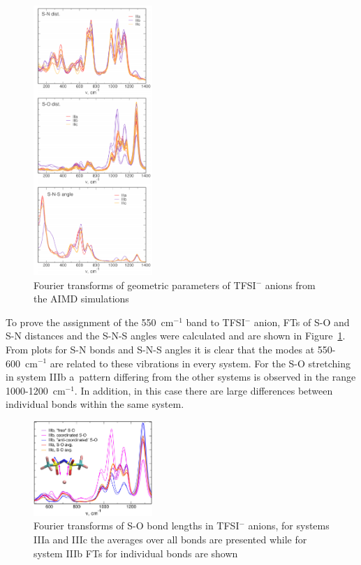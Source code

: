 \begin{figure}[ht]
    \centering
    \includegraphics[width=0.4\textwidth]{img/4-ir-spectra-from-aimd-simulations/2-mg-cl-dme/ft-s-o-angles.png}
    \caption{Fourier transforms of geometric parameters of TFSI$^{-}$ anions from the AIMD simulations}
    \label{fig:mg-cl-dme-ft-s-o-angles}
\end{figure}

To prove the assignment of the 550~cm$^{-1}$ band to TFSI$^{-}$ anion, FTs of S-O and S-N distances and the S-N-S angles were calculated and are shown in Figure~\ref{fig:mg-cl-dme-ft-s-o-angles}. From plots for S-N bonds and S-N-S angles it is clear that the modes at 550-600~cm$^{-1}$ are related to these vibrations in every system. For the S-O stretching in system IIIb a~pattern differing from the other systems is observed in the range 1000-1200~cm$^{-1}$. In addition, in this case there are large differences between individual bonds within the same system.

\begin{figure}[ht]
    \centering
    \includegraphics[width=0.4\textwidth]{img/4-ir-spectra-from-aimd-simulations/2-mg-cl-dme/ft-s-o.png}
    \caption{Fourier transforms of S-O bond lengths in TFSI$^{-}$ anions, for systems IIIa and IIIc the averages over all bonds are presented while for system IIIb FTs for individual bonds are shown}
    \label{fig:mg-cl-dme-ft-s-o}
\end{figure}

